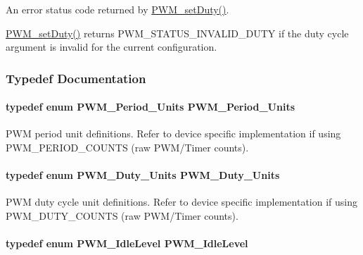 An error status code returned by \hyperlink{_p_w_m_8h_a90979a3b8d525f266c2b82e012f68cee}{P\+W\+M\+\_\+set\+Duty()}. 

\hyperlink{_p_w_m_8h_a90979a3b8d525f266c2b82e012f68cee}{P\+W\+M\+\_\+set\+Duty()} returns P\+W\+M\+\_\+\+S\+T\+A\+T\+U\+S\+\_\+\+I\+N\+V\+A\+L\+I\+D\+\_\+\+D\+U\+T\+Y if the duty cycle argument is invalid for the current configuration. 

\subsubsection{Typedef Documentation}
\paragraph[{P\+W\+M\+\_\+\+Period\+\_\+\+Units}]{\setlength{\rightskip}{0pt plus 5cm}typedef enum {\bf P\+W\+M\+\_\+\+Period\+\_\+\+Units}  {\bf P\+W\+M\+\_\+\+Period\+\_\+\+Units}}\label{_p_w_m_8h_a662b819cdd93b4f2864ffe3bbadd0a03}


P\+W\+M period unit definitions. Refer to device specific implementation if using P\+W\+M\+\_\+\+P\+E\+R\+I\+O\+D\+\_\+\+C\+O\+U\+N\+T\+S (raw P\+W\+M/\+Timer counts). 

\paragraph[{P\+W\+M\+\_\+\+Duty\+\_\+\+Units}]{\setlength{\rightskip}{0pt plus 5cm}typedef enum {\bf P\+W\+M\+\_\+\+Duty\+\_\+\+Units}  {\bf P\+W\+M\+\_\+\+Duty\+\_\+\+Units}}\label{_p_w_m_8h_a22bd075b8383527f3e5dcfb9e574f217}


P\+W\+M duty cycle unit definitions. Refer to device specific implementation if using P\+W\+M\+\_\+\+D\+U\+T\+Y\+\_\+\+C\+O\+U\+N\+T\+S (raw P\+W\+M/\+Timer counts). 

\paragraph[{P\+W\+M\+\_\+\+Idle\+Level}]{\setlength{\rightskip}{0pt plus 5cm}typedef enum {\bf P\+W\+M\+\_\+\+Idle\+Level}  {\bf P\+W\+M\+\_\+\+Idle\+Level}}\label{_p_w_m_8h_a0584e30a7a05a2195d3ef8a9ba4a5609}


